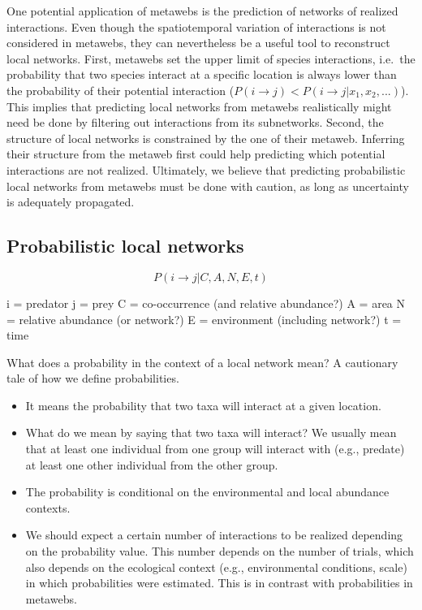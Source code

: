 \documentclass[10pt,oneside]{article}
\begin{document}
One potential application of metawebs is the prediction of networks of
realized interactions. Even though the spatiotemporal variation of
interactions is not considered in metawebs, they can nevertheless be a
useful tool to reconstruct local networks. First, metawebs set the upper
limit of species interactions, i.e.~the probability that two species
interact at a specific location is always lower than the probability of
their potential interaction
(\(P(i \rightarrow j) < P(i \rightarrow j | x_1, x_2, ...)\)). This
implies that predicting local networks from metawebs realistically might
need be done by filtering out interactions from its subnetworks. Second,
the structure of local networks is constrained by the one of their
metaweb. Inferring their structure from the metaweb first could help
predicting which potential interactions are not realized. Ultimately, we
believe that predicting probabilistic local networks from metawebs must
be done with caution, as long as uncertainty is adequately propagated.

\hypertarget{probabilistic-local-networks}{%
\subsection{Probabilistic local
networks}\label{probabilistic-local-networks}}

\[P(i \rightarrow j | C, A, N, E, t)\]

i = predator j = prey C = co-occurrence (and relative abundance?) A =
area N = relative abundance (or network?) E = environment (including
network?) t = time

What does a probability in the context of a local network mean? A
cautionary tale of how we define probabilities.

\begin{itemize}
\tightlist
\item
  It means the probability that two taxa will interact at a given
  location.
\item
  What do we mean by saying that two taxa will interact? We usually mean
  that at least one individual from one group will interact with (e.g.,
  predate) at least one other individual from the other group.
\item
  The probability is conditional on the environmental and local
  abundance contexts.
\item
  We should expect a certain number of interactions to be realized
  depending on the probability value. This number depends on the number
  of trials, which also depends on the ecological context (e.g.,
  environmental conditions, scale) in which probabilities were
  estimated. This is in contrast with probabilities in metawebs.
\end{itemize}
\end{document}
